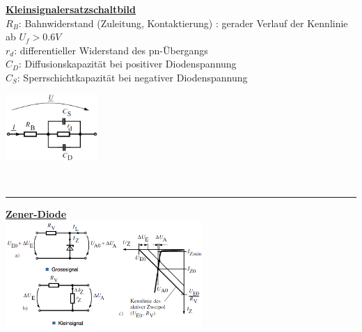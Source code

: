             \begin{minipage}[T]{15.5cm}
                 \underline{\bf Kleinsignalersatzschaltbild}\\
                $R_B$: Bahnwiderstand (Zuleitung, Kontaktierung) : gerader Verlauf der Kennlinie ab $U_f >0.6V$\\
                $r_d$: differentieller Widerstand des pn-\"Ubergangs\\
                $C_D$: Diffusionskapazit\"at bei positiver Diodenspannung\\
                $C_S$: Sperrschichtkapazit\"at bei negativer Diodenspannung\\
            \end{minipage}
            \begin{minipage}{3.5cm}
                \includegraphics[width=3.5cm]{./bilder/DiodeKleinsigErs}\\
            \end{minipage}\\
\hrule
\vspace{1mm}
            \begin{minipage}[t]{9cm}
                \underline{\bf Zener-Diode}\\
                \includegraphics[height=4cm]{./bilder/ZDiodeEig}
            \end{minipage}
